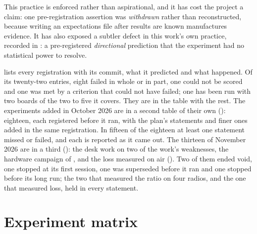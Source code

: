 This practice is enforced rather than aspirational, and it has cost the project a claim: one
pre-registration assertion was \emph{withdrawn} rather than reconstructed, because writing an
expectations file after results are known manufactures evidence. It has also exposed a subtler
defect in this work's own practice, recorded in : a pre-registered
\emph{directional} prediction that the experiment had no statistical power to resolve.

 lists every registration with its commit, what it predicted and what
happened. Of its twenty-two entries, eight failed in whole or in part, one could not be scored and
one was met by a criterion that could not have failed; one has been run with two boards of the
two to five it covers. They are in the table with the rest. The experiments added in October
2026 are in a second table of their own (): eighteen, each registered
before it ran, with the plan's statements and finer ones added in the same registration. In
fifteen of the eighteen at least one statement missed or failed, and each is reported as it
came out. The thirteen of November 2026 are in a third (): the desk work on
two of the work's weaknesses, the hardware campaign of , and the loss
measured on air (). Two of them ended void, one stopped at its first session,
one was superseded before it ran and one stopped before its long run; the two that measured the
ratio on four radios, and the one that measured loss, held in every statement.

\section{Experiment matrix}

